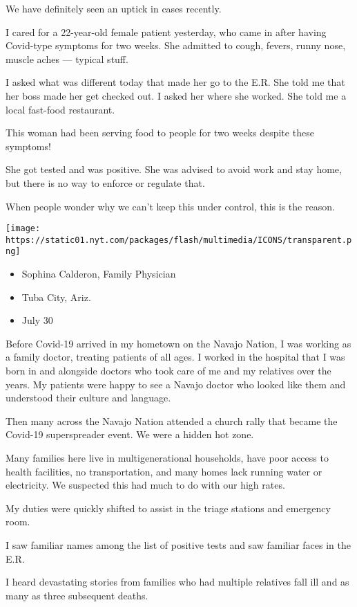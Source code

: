 We have definitely seen an uptick in cases recently.

I cared for a 22-year-old female patient yesterday, who came in after
having Covid-type symptoms for two weeks. She admitted to cough, fevers,
runny nose, muscle aches --- typical stuff.

I asked what was different today that made her go to the E.R. She told
me that her boss made her get checked out. I asked her where she worked.
She told me a local fast-food restaurant.

This woman had been serving food to people for two weeks despite these
symptoms!

She got tested and was positive. She was advised to avoid work and stay
home, but there is no way to enforce or regulate that.

When people wonder why we can't keep this under control, this is the
reason.

\texttt{[image: https://static01.nyt.com/packages/flash/multimedia/ICONS/transparent.png]}

\begin{itemize}
\tightlist
\item
  Sophina Calderon, Family Physician
\item
  Tuba City, Ariz.
\item
  July 30
\end{itemize}

Before Covid-19 arrived in my hometown on the Navajo Nation, I was
working as a family doctor, treating patients of all ages. I worked in
the hospital that I was born in and alongside doctors who took care of
me and my relatives over the years. My patients were happy to see a
Navajo doctor who looked like them and understood their culture and
language.

Then many across the Navajo Nation attended a church rally that became
the Covid-19 superspreader event. We were a hidden hot zone.

Many families here live in multigenerational households, have poor
access to health facilities, no transportation, and many homes lack
running water or electricity. We suspected this had much to do with our
high rates.

My duties were quickly shifted to assist in the triage stations and
emergency room.

I saw familiar names among the list of positive tests and saw familiar
faces in the E.R.

I heard devastating stories from families who had multiple relatives
fall ill and as many as three subsequent deaths.

